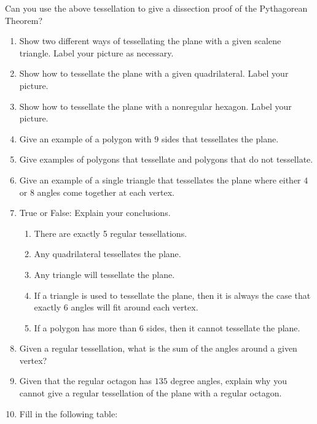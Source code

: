 \begin{ques} Can you use the above tessellation to give a dissection proof of the Pythagorean Theorem?
\end{ques}
\QM








\newpage

\problems
\begin{enumerate}
\item Show two different ways of tessellating the plane with a given scalene triangle. Label your picture as necessary.
\item Show how to tessellate the plane with a given quadrilateral. Label your picture.
\item Show how to tessellate the plane with a nonregular hexagon. Label your picture.
\item Give an example of a polygon with $9$ sides that tessellates the plane.
\item Give examples of polygons that tessellate and polygons that do
  not tessellate.
\item Give an example of a single triangle that tessellates the plane where
  either $4$ or $8$ angles come together at each vertex.
\item True or False: Explain your conclusions.
\begin{enumerate}
\item There are exactly 5 regular tessellations.
\item Any quadrilateral tessellates the plane.
\item Any triangle will tessellate the plane.
\item If a triangle is used to tessellate the plane, then it is always
  the case that exactly $6$ angles will fit around each vertex.
\item If a polygon has more than 6 sides, then it cannot tessellate the plane.
\end{enumerate}
\item Given a regular tessellation, what is the sum of the angles
  around a given vertex?
\item Given that the regular octagon has $135$ degree angles, explain
  why you cannot give a regular tessellation of the plane with a
  regular octagon.
\item \label{tesstable} Fill in the following table:
\begin{center}
\begin{tabular}{|c || c| c| c|}\hline

\end{tabular}
\end{center}
\end{enumerate}
